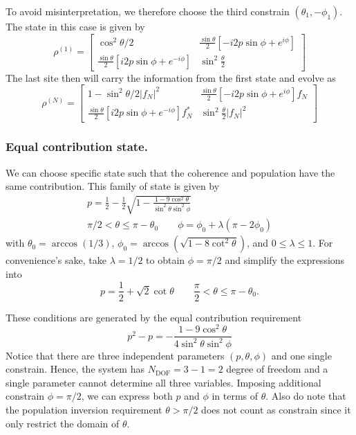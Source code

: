 \documentclass[../../../main.tex]{subfiles}
\begin{document}
To avoid misinterpretation, we therefore choose the third constrain \((\theta_1,-\phi_1)\).
The state in this case is given by
\begin{equation*}
  \rho ^{(1)} =
  \begin{bmatrix}
    \cos ^2 \theta/2                                                 & \frac{\sin \theta}{2} \left[-i2p \sin \phi + e^{i\phi}  \right] \\
    \frac{\sin \theta  }{2} \left[i2p \sin\phi + e^{-i\phi}  \right] & \sin ^2 \frac{\theta  }{2}
  \end{bmatrix}
\end{equation*}
The last site then will carry the information from the first state and evolve as
\begin{equation*}
  \rho ^{(N)}  =
  \begin{bmatrix}
    1- \sin^2 \theta/2 |f_N|^2                                             & \frac{\sin \theta}{2} \left[-i2p \sin \phi + e^{i\phi}  \right]f_N \\
    \frac{\sin \theta  }{2} \left[i2p \sin\phi + e^{-i\phi}  \right]f_N ^* & \sin ^2 \frac{\theta  }{2}|f_N|^2
  \end{bmatrix}
\end{equation*}

\subsubsection{Equal contribution state.}
We can choose specific state such that the coherence and population have the same contribution.
This family of state is given by
\begin{gather*}
  p = \frac{1 }{2 }- \frac{1 }{2} \sqrt{1 - \frac{1-9\cos^2\theta}{\sin^2\theta\sin^2\phi}}\\
  \pi/2<\theta\le \pi - \theta_0 \qquad
  \phi = \phi_0 + \lambda( \pi - 2\phi_0)
\end{gather*}
with $\theta_0 = \arccos(1/3)$, $\phi_0 = \arccos(\sqrt{ 1-8 \cot ^2 \theta}) $, and $0 \le \lambda \le 1$.
For convenience’s sake, take $\lambda=1/2$ to obtain $\phi=\pi/2$ and simplify the expressions into
\begin{equation*}
  p=\frac12+\sqrt2\cot\theta\qquad
  \frac{\pi}{2}<\theta\le\pi-\theta_0.
\end{equation*}

These conditions are generated by the equal contribution requirement
\begin{equation*}
  p^2-p=- \frac{1-9\cos^2\theta}{4\sin^2\theta\sin^2\phi}
\end{equation*}
Notice that there are three independent parameters $(p,\theta,\phi)$ and one single constrain.
Hence, the system has $N_\text{DOF} = 3-1 =2$ degree of freedom and a single parameter cannot determine all three variables.
Imposing additional constrain $\phi = \pi/2$, we can express both $p$ and $\phi$ in terms of $\theta$.
Also do note that the population inversion requirement $\theta>\pi/2$ does not count as constrain since it only restrict the domain of $\theta$.
\end{document}
